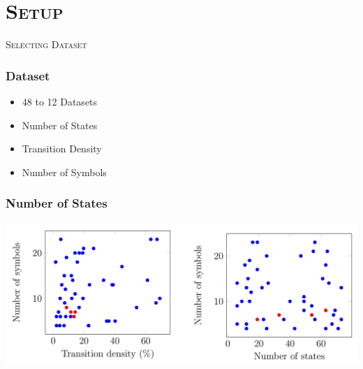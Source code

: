 \section{\scshape Setup}



\begin{frame}
	\center \huge \scshape Selecting Dataset
\end{frame}

\begin{frame}
	\frametitle{Dataset}
	\begin{itemize}
		\item 48 to 12 Datasets
		\item Number of States
		\item Transition Density
		\item Number of Symbols
	\end{itemize}
\end{frame}

\begin{frame}
	\frametitle{Number of States}
		\begin{centering}
			\includegraphics[width=1\textwidth]{images/states.png}
		\end{centering}
\end{frame}

